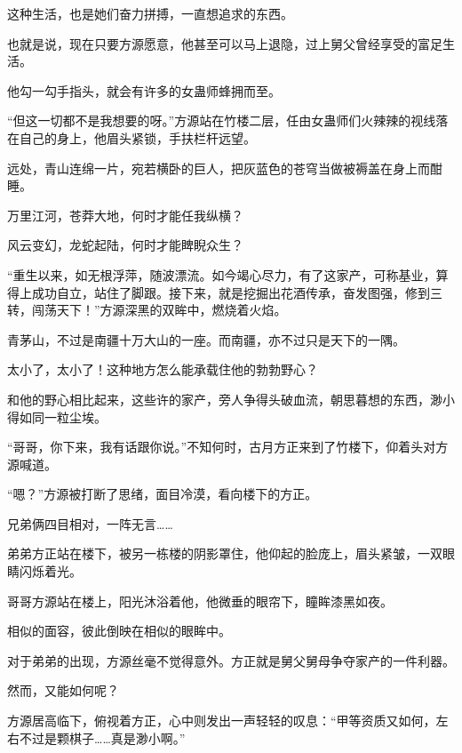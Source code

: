 \begin{this_body}
这种生活，也是她们奋力拼搏，一直想追求的东西。

也就是说，现在只要方源愿意，他甚至可以马上退隐，过上舅父曾经享受的富足生活。

他勾一勾手指头，就会有许多的女蛊师蜂拥而至。

“但这一切都不是我想要的呀。”方源站在竹楼二层，任由女蛊师们火辣辣的视线落在自己的身上，他眉头紧锁，手扶栏杆远望。

远处，青山连绵一片，宛若横卧的巨人，把灰蓝色的苍穹当做被褥盖在身上而酣睡。

万里江河，苍莽大地，何时才能任我纵横？

风云变幻，龙蛇起陆，何时才能睥睨众生？

“重生以来，如无根浮萍，随波漂流。如今竭心尽力，有了这家产，可称基业，算得上成功自立，站住了脚跟。接下来，就是挖掘出花酒传承，奋发图强，修到三转，闯荡天下！”方源深黑的双眸中，燃烧着火焰。

青茅山，不过是南疆十万大山的一座。而南疆，亦不过只是天下的一隅。

太小了，太小了！这种地方怎么能承载住他的勃勃野心？

和他的野心相比起来，这些许的家产，旁人争得头破血流，朝思暮想的东西，渺小得如同一粒尘埃。

“哥哥，你下来，我有话跟你说。”不知何时，古月方正来到了竹楼下，仰着头对方源喊道。

“嗯？”方源被打断了思绪，面目冷漠，看向楼下的方正。

兄弟俩四目相对，一阵无言……

弟弟方正站在楼下，被另一栋楼的阴影罩住，他仰起的脸庞上，眉头紧皱，一双眼睛闪烁着光。

哥哥方源站在楼上，阳光沐浴着他，他微垂的眼帘下，瞳眸漆黑如夜。

相似的面容，彼此倒映在相似的眼眸中。

对于弟弟的出现，方源丝毫不觉得意外。方正就是舅父舅母争夺家产的一件利器。

然而，又能如何呢？

方源居高临下，俯视着方正，心中则发出一声轻轻的叹息：“甲等资质又如何，左右不过是颗棋子……真是渺小啊。”

\end{this_body}

